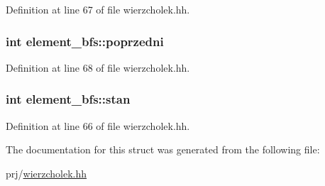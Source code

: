 \-Definition at line 67 of file wierzcholek.\-hh.

\hypertarget{structelement__bfs_a94b882f6922be485d6942f71c29e581d}{
\subsubsection[{poprzedni}]{\setlength{\rightskip}{0pt plus 5cm}int {\bf element\-\_\-bfs\-::poprzedni}}}\label{structelement__bfs_a94b882f6922be485d6942f71c29e581d}


\-Definition at line 68 of file wierzcholek.\-hh.

\hypertarget{structelement__bfs_aa654df64808f513f41d0349571e4b90e}{
\subsubsection[{stan}]{\setlength{\rightskip}{0pt plus 5cm}int {\bf element\-\_\-bfs\-::stan}}}\label{structelement__bfs_aa654df64808f513f41d0349571e4b90e}


\-Definition at line 66 of file wierzcholek.\-hh.



\-The documentation for this struct was generated from the following file\-:\begin{DoxyCompactItemize}
\item 
prj/\hyperlink{wierzcholek_8hh}{wierzcholek.\-hh}\end{DoxyCompactItemize}
